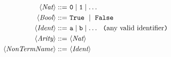 \begin{align*}
     \langle\textit{Nat}\rangle                 ::=~       & \texttt{0} \mid \texttt{1} \mid \dots                                                  \\
     \langle\textit{Bool}\rangle                ::=~       & \texttt{True}~\mid~\texttt{False}                                                                      \\
     \langle\textit{Ident}\rangle               ::=~       & \texttt{a} \mid \texttt{b} \mid \dots~~\texttt{(}\text{any valid identifier}\texttt{)}~        \\
     \langle\textit{Arity}\rangle               ::=~       & \langle\textit{Nat}\rangle                                                                                   \\
     \langle\textit{NonTermName}\rangle         ::=~       & \langle\textit{Ident}\rangle                                                                                 \\
\end{align*}
